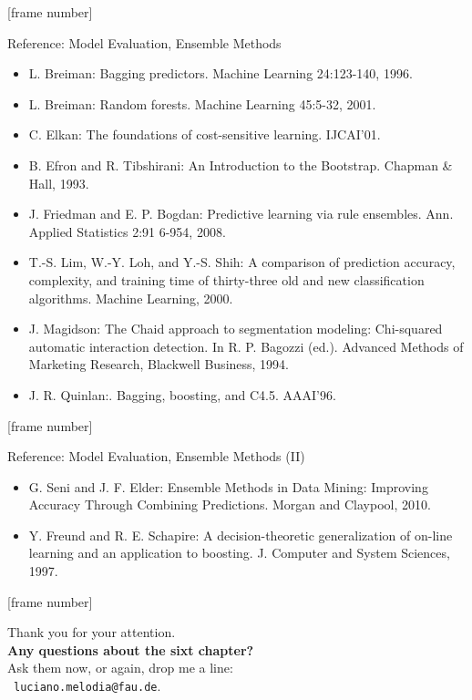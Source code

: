\documentclass[aspectratio=169,t,table]{beamer}
\begin{document}
  {
    [frame number]
    \begin{frame}{Reference: Model Evaluation, Ensemble Methods}
      \begin{itemize}
        \item L. Breiman: Bagging predictors. Machine Learning 24:123-140, 1996.
        \item L. Breiman: Random forests. Machine Learning 45:5-32, 2001.
        \item C. Elkan: The foundations of cost-sensitive learning. IJCAI'01.
        \item B. Efron and R. Tibshirani: An Introduction to the Bootstrap. Chapman \& Hall, 1993.
        \item J. Friedman and E. P. Bogdan: Predictive learning via rule ensembles. Ann. Applied Statistics 2:91 6-954, 2008.
        \item T.-S. Lim, W.-Y. Loh, and Y.-S. Shih: A comparison of prediction accuracy, complexity, and training time of thirty-three old and new classification algorithms. Machine Learning, 2000.
        \item J. Magidson: The Chaid approach to segmentation modeling: Chi-squared automatic interaction detection. In R. P. Bagozzi (ed.). Advanced Methods of Marketing Research, Blackwell Business, 1994.
        \item J. R. Quinlan:. Bagging, boosting, and C4.5. AAAI'96.
      \end{itemize}
    \end{frame}
  }

  {
    [frame number]
    \begin{frame}{Reference: Model Evaluation, Ensemble Methods (II)}
      \begin{itemize}
        \item G. Seni and J. F. Elder: Ensemble Methods in Data Mining: Improving Accuracy Through Combining Predictions. Morgan and Claypool, 2010.
        \item Y. Freund and R. E. Schapire: A decision-theoretic generalization of on-line learning and an application to boosting. J. Computer and System Sciences, 1997.
      \end{itemize}
    \end{frame}
  }

  { %
    [frame number]
    \begin{frame}[c]
      \begin{center}
        Thank you for your attention.\\
        {\bf Any questions about the sixt chapter?}\\[0.5cm]
        Ask them now, or again, drop me a line: \\
        \faSendO \ \texttt{luciano.melodia@fau.de}.
      \end{center}
    \end{frame}
  }
\end{document}
